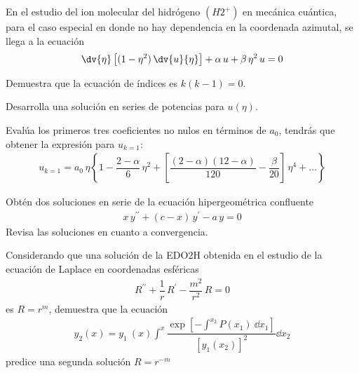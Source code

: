 \begin{milista}
\begin{milista}
\end{milista}
\item En el estudio del ion molecular del hidrógeno $(H2^{+})$ en mecánica cuántica, para el caso especial en donde no hay dependencia en la coordenada azimutal, se llega a la ecuación
\begin{align*}
\dv{\eta} \left[ (1 - \eta^{2} ) \, \dv{u}{\eta} \right] + \alpha \, u + \beta \, \eta^{2} \, u = 0
\end{align*}
\begin{milista}
\item Demuestra que la ecuación de índices es $k(k-1) = 0$.
\item Desarrolla una solución en series de potencias para $u(\eta)$. 
\item Evalúa los primeros tres coeficientes no nulos en términos de $a_{0}$, tendrás que obtener la expresión para $u_{k=1}$:
\begin{align*}
u_{k=1} =  a_{0} \, \eta \left\lbrace 1 - \dfrac{2- \alpha}{6} \, \eta^{2} + \left[ \dfrac{(2-\alpha)(12-\alpha)}{120} - \dfrac{\beta}{20} \right] \, \eta^{4} + \ldots \right\rbrace
\end{align*}
\end{milista}
\item Obtén dos soluciones en serie de la ecuación hipergeométrica confluente
\begin{align*}
x \, y^{\prime \prime} + (c - x) \, y^{\prime} - a \, y = 0
\end{align*}
Revisa las soluciones en cuanto a convergencia.
\item Considerando que una solución de la EDO2H obtenida en el estudio de la ecuación de Laplace en coordenadas esféricas
\begin{align*}
R^{\prime \prime} + \dfrac{1}{r} \, R^{\prime} - \dfrac{m^{2}}{r^{2}} \, R = 0
\end{align*}
es $R = r^{m}$, demuestra que la ecuación
\begin{align*}
y_{2}(x) =  y_{1} \: (x) \int^{x} \dfrac{\exp \left[ \displaystyle - \int^{x_{2}} P(x_{1}) \: \dd{x_{1}} \right]}{[y_{1}(x_{2})]^{2}} \dd{x_{2}}
\end{align*}
predice una segunda solución $R = r^{-m}$

\end{milista}
